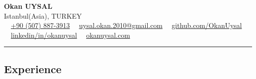 \documentclass[11pt,letterpaper]{article}
\begin{document}
\begin{center}
	{\LARGE \textbf{Okan UYSAL}}\\
	Istanbul(Asia), TURKEY
	\vspace{0.04cm}
	\\
	\raisebox{-0.2\height} {\Large \faPhoneSquare} \ \  \href{tel:+905078873913}{+90 (507) 887-3913} \hfill\raisebox{-0.2\height}{\Large \faEnvelopeSquare} \ \ \href{mailto:uysal.okan.2010@gmail.com}{uysal.okan.2010@gmail.com} \hfill \raisebox{-0.2\height}{\Large \faGithubSquare} \ \ \href{https://www.github.com/OkanUysal}{github.com/OkanUysal} 
	\\
	\raisebox{-0.2\height}{\Large \faLinkedinSquare} \ \ \href{https://www.linkedin.com/in/okanuysal}{linkedin/in/okanuysal} \raisebox{-0.2\height}{\Large \faGlobe} \ \ \href{https://okanuysal.com}{okanuysal.com}
\end{center}


\hrule
\vspace{-1em}
\subsection*{\Large Experience}
\end{document}
